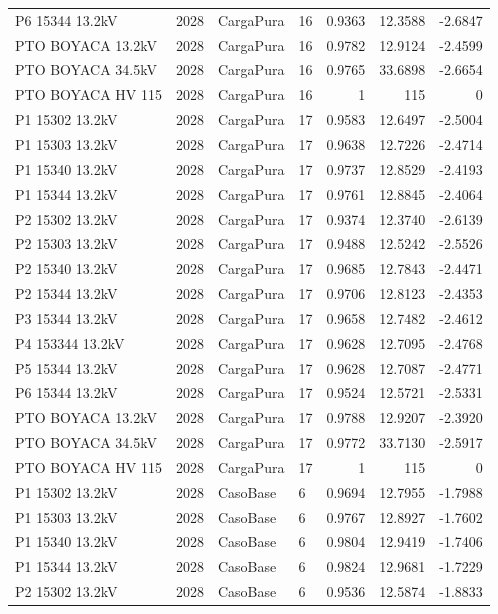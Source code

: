 \documentclass[11pt,a4paper]{article}
\begin{document}
\begin{longtable}{llllrrr}
P6 15344 13.2kV & 2028 & CargaPura & 16 & 0.9363 & 12.3588 & -2.6847 \\
PTO BOYACA 13.2kV & 2028 & CargaPura & 16 & 0.9782 & 12.9124 & -2.4599 \\
PTO BOYACA 34.5kV & 2028 & CargaPura & 16 & 0.9765 & 33.6898 & -2.6654 \\
PTO BOYACA HV 115 & 2028 & CargaPura & 16 & 1 & 115 & 0 \\
P1 15302 13.2kV & 2028 & CargaPura & 17 & 0.9583 & 12.6497 & -2.5004 \\
P1 15303 13.2kV & 2028 & CargaPura & 17 & 0.9638 & 12.7226 & -2.4714 \\
P1 15340 13.2kV & 2028 & CargaPura & 17 & 0.9737 & 12.8529 & -2.4193 \\
P1 15344 13.2kV & 2028 & CargaPura & 17 & 0.9761 & 12.8845 & -2.4064 \\
P2 15302 13.2kV & 2028 & CargaPura & 17 & 0.9374 & 12.3740 & -2.6139 \\
P2 15303 13.2kV & 2028 & CargaPura & 17 & 0.9488 & 12.5242 & -2.5526 \\
P2 15340 13.2kV & 2028 & CargaPura & 17 & 0.9685 & 12.7843 & -2.4471 \\
P2 15344 13.2kV & 2028 & CargaPura & 17 & 0.9706 & 12.8123 & -2.4353 \\
P3 15344 13.2kV & 2028 & CargaPura & 17 & 0.9658 & 12.7482 & -2.4612 \\
P4 153344 13.2kV & 2028 & CargaPura & 17 & 0.9628 & 12.7095 & -2.4768 \\
P5 15344 13.2kV & 2028 & CargaPura & 17 & 0.9628 & 12.7087 & -2.4771 \\
P6 15344 13.2kV & 2028 & CargaPura & 17 & 0.9524 & 12.5721 & -2.5331 \\
PTO BOYACA 13.2kV & 2028 & CargaPura & 17 & 0.9788 & 12.9207 & -2.3920 \\
PTO BOYACA 34.5kV & 2028 & CargaPura & 17 & 0.9772 & 33.7130 & -2.5917 \\
PTO BOYACA HV 115 & 2028 & CargaPura & 17 & 1 & 115 & 0 \\
P1 15302 13.2kV & 2028 & CasoBase & 6 & 0.9694 & 12.7955 & -1.7988 \\
P1 15303 13.2kV & 2028 & CasoBase & 6 & 0.9767 & 12.8927 & -1.7602 \\
P1 15340 13.2kV & 2028 & CasoBase & 6 & 0.9804 & 12.9419 & -1.7406 \\
P1 15344 13.2kV & 2028 & CasoBase & 6 & 0.9824 & 12.9681 & -1.7229 \\
P2 15302 13.2kV & 2028 & CasoBase & 6 & 0.9536 & 12.5874 & -1.8833 \\

\end{longtable}
\end{document}
